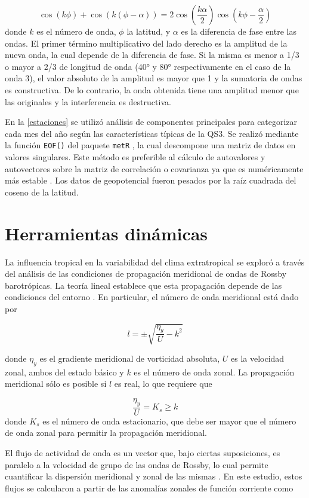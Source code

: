 \documentclass[spanish,a4paper,12pt,oneside]{book}
\begin{document}
\[
\cos\left (k\phi \right) + \cos(k(\phi - \alpha)) = 2\cos\left( \frac{k\alpha}{2} \right)\cos\left( k\phi - \frac{\alpha}{2}\right) 
\] donde \(k\) es el número de onda, \(\phi\) la latitud, y \(\alpha\)
es la diferencia de fase entre las ondas. El primer término
multiplicativo del lado derecho es la amplitud de la nueva onda, la cual
depende de la diferencia de fase. Si la misma es menor a 1/3 o mayor a
2/3 de longitud de onda (40° y 80° respectivamente en el caso de la onda
3), el valor absoluto de la amplitud es mayor que 1 y la sumatoria de
ondas es constructiva. De lo contrario, la onda obtenida tiene una
amplitud menor que las originales y la interferencia es destructiva.

En la \autoref{estaciones} se utilizó análisis de componentes
principales para categorizar cada mes del año según las características
típicas de la QS3. Se realizó mediante la función \texttt{EOF()} del
paquete \texttt{metR} \citep{R-metR}, la cual descompone una matriz de
datos en valores singulares. Este método es preferible al cálculo de
autovalores y autovectores sobre la matriz de correlación o covarianza
ya que es numéricamente más estable \citep{Venegas2001}. Los datos de
geopotencial fueron pesados por la raíz cuadrada del coseno de la
latitud.

\section*{Herramientas dinámicas}

La influencia tropical en la variabilidad del clima extratropical se
exploró a través del análisis de las condiciones de propagación
meridional de ondas de Rossby barotrópicas. La teoría lineal establece
que esta propagación depende de las condiciones del entorno
\citep{James}. En particular, el número de onda meridional está dado por

\[
l = \pm \sqrt{\frac{\eta_{y}}{U} - k^2}
\]

donde \(\eta_{y}\) es el gradiente meridional de vorticidad absoluta,
\(U\) es la velocidad zonal, ambos del estado básico y \(k\) es el
número de onda zonal. La propagación meridional sólo es posible si \(l\)
es real, lo que requiere que

\[
\frac{\eta_{y}}{U} = K_s \ge k 
\] donde \(K_s\) es el número de onda estacionario, que debe ser mayor
que el número de onda zonal para permitir la propagación meridional.

El flujo de actividad de onda es un vector que, bajo ciertas
suposiciones, es paralelo a la velocidad de grupo de las ondas de
Rossby, lo cual permite cuantificar la dispersión meridional y zonal de
las mismas \citep{James}. En este estudio, estos flujos se calcularon a
partir de las anomalías zonales de función corriente como
\end{document}
